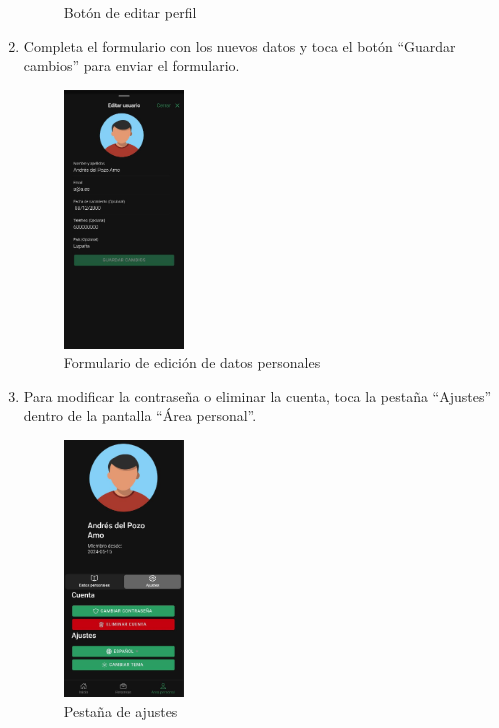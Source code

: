 \begin{enumerate}
\begin{figure}[H]
		      \caption{Botón de editar perfil}
	      \end{figure}
	\item Completa el formulario con los nuevos datos y toca el botón “Guardar cambios” para enviar el formulario.
	      \begin{figure}[H]
		      \centering
		      \includegraphics[width=0.3\textwidth]{7-Construccion/Manuales/app/P3-Perfil.png}
		      \caption{Formulario de edición de datos personales}
	      \end{figure}
	\item Para modificar la contraseña o eliminar la cuenta, toca la pestaña “Ajustes” dentro de la pantalla “Área personal”.
	      \begin{figure}[H]
		      \centering
		      \includegraphics[width=0.3\textwidth]{7-Construccion/Manuales/app/P4-Perfil.png}
		      \caption{Pestaña de ajustes}
	      \end{figure}

\end{enumerate}

